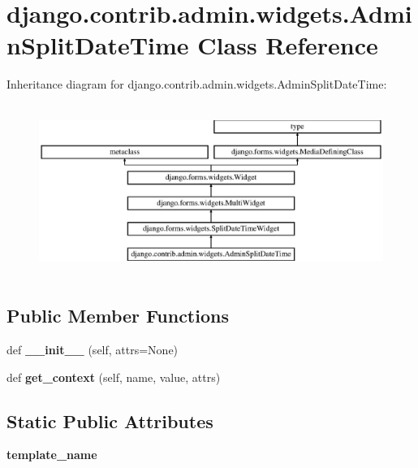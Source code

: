 \hypertarget{classdjango_1_1contrib_1_1admin_1_1widgets_1_1_admin_split_date_time}{}\section{django.\+contrib.\+admin.\+widgets.\+Admin\+Split\+Date\+Time Class Reference}
\label{classdjango_1_1contrib_1_1admin_1_1widgets_1_1_admin_split_date_time}
Inheritance diagram for django.\+contrib.\+admin.\+widgets.\+Admin\+Split\+Date\+Time\+:\begin{figure}[H]
\begin{center}
\leavevmode
\includegraphics[height=5.618729cm]{classdjango_1_1contrib_1_1admin_1_1widgets_1_1_admin_split_date_time}
\end{center}
\end{figure}
\subsection*{Public Member Functions}
\begin{DoxyCompactItemize}
\item 
\mbox{\label{classdjango_1_1contrib_1_1admin_1_1widgets_1_1_admin_split_date_time_a3536c6bfb6952809e18788d54d5bb401}} 
def {\bfseries \+\_\+\+\_\+init\+\_\+\+\_\+} (self, attrs=None)
\item 
\mbox{\label{classdjango_1_1contrib_1_1admin_1_1widgets_1_1_admin_split_date_time_a6546a873b2ce02ebc691ca6082a72762}} 
def {\bfseries get\+\_\+context} (self, name, value, attrs)
\end{DoxyCompactItemize}
\subsection*{Static Public Attributes}
\begin{DoxyCompactItemize}
\item 
\mbox{\label{classdjango_1_1contrib_1_1admin_1_1widgets_1_1_admin_split_date_time_aa4c652fd7b2c03a9d75c909beeb488cf}} 
{\bfseries template\+\_\+name}
\end{DoxyCompactItemize}
